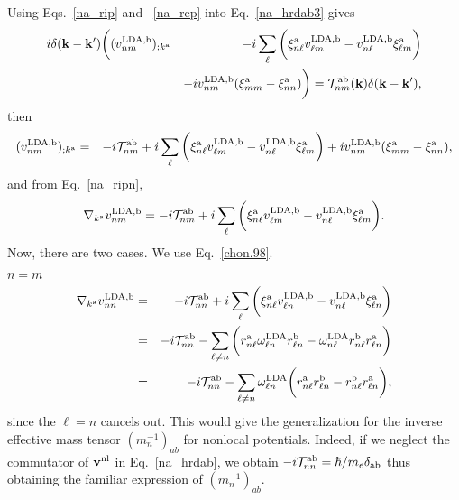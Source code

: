 Using Eqs.~\eqref{na_rip} and ~\eqref{na_rep}
into Eq.~\eqref{na_hrdab3} gives
\begin{eqnarray}\label{na_rapb}
i\delta(\mathbf{k}-\mathbf{k}')
\bigg(
(v^{\mathrm{LDA},\mathrm{b}}_{nm})_{;k^{\mathrm{a}}}
&&
-i
\sum_{\ell}
\bigg(
\xi^{\mathrm{a}}_{n\ell}
v^{\mathrm{LDA},\mathrm{b}}_{\ell m}
-
v^{\mathrm{LDA},\mathrm{b}}_{n\ell}
\xi^{\mathrm{a}}_{\ell m}
\bigg)
\nonumber \\
&&
-i
v^{\mathrm{LDA},\mathrm{b}}_{nm}(\xi^{\mathrm{a}}_{mm}
-
\xi^{\mathrm{a}}_{nn}
)
\bigg)
=
{\cal T}^{\mathrm{a}\mathrm{b}}_{nm}(\mathbf{k})\delta(\mathbf{k}-\mathbf{k}')
,
\end{eqnarray}
then
\begin{eqnarray}\label{na_rapb2}
(v^{\mathrm{LDA},\mathrm{b}}_{nm})_{;k^{\mathrm{a}}}&=&
-i
{\cal T}^{\mathrm{a}\mathrm{b}}_{nm}
+i
\sum_{\ell}
\bigg(
\xi^{\mathrm{a}}_{n\ell}
v^{\mathrm{LDA},\mathrm{b}}_{\ell m}
-
v^{\mathrm{LDA},\mathrm{b}}_{n\ell}
\xi^{\mathrm{a}}_{\ell m}
\bigg)
+i
v^{\mathrm{LDA},\mathrm{b}}_{nm}(\xi^{\mathrm{a}}_{mm}
-
\xi^{\mathrm{a}}_{nn}
)
,
\end{eqnarray}
and from Eq.~\eqref{na_ripn},
\begin{eqnarray}\label{ncogno}
\nabla_{k^{\mathrm{a}}}v^{\mathrm{LDA},\mathrm{b}}_{nm}=
-i{\cal T}^{\mathrm{a}\mathrm{b}}_{nm}
+i
\sum_{\ell}
\bigg(
\xi^{\mathrm{a}}_{n\ell}
v^{\mathrm{LDA},\mathrm{b}}_{\ell m}
-
v^{\mathrm{LDA},\mathrm{b}}_{n\ell}
\xi^{\mathrm{a}}_{\ell m}
\bigg)
.
\end{eqnarray}
Now, there are two cases. We use Eq.~\eqref{chon.98}.

 $n=m$
\begin{eqnarray}\label{ntita}
\nabla_{k^{\mathrm{a}}}v^{\mathrm{LDA},\mathrm{b}}_{nn}&=&
-i{\cal T}^{\mathrm{a}\mathrm{b}}_{nn}
+i
\sum_{\ell}
\bigg(
\xi^{\mathrm{a}}_{n\ell}
v^{\mathrm{LDA},\mathrm{b}}_{\ell n}
-
v^{\mathrm{LDA},\mathrm{b}}_{n\ell}
\xi^{\mathrm{a}}_{\ell n}
\bigg)
\nonumber\\
&=&
-i{\cal T}^{\mathrm{a}\mathrm{b}}_{nn}
-
\sum_{\ell\ne n}
\bigg(
r^{\mathrm{a}}_{n\ell}
\omega^{\mathrm{LDA}}_{\ell n}
r^{\mathrm{b}}_{\ell n}
-
\omega^{\mathrm{LDA}}_{n\ell}
r^{\mathrm{b}}_{n\ell}
r^{\mathrm{a}}_{\ell n}
\bigg)
\nonumber\\
&=&
-i{\cal T}^{\mathrm{a}\mathrm{b}}_{nn}
-
\sum_{\ell\ne n}
\omega^{\mathrm{LDA}}_{\ell n}
\bigg(
r^{\mathrm{a}}_{n\ell}
r^{\mathrm{b}}_{\ell n}
-
r^{\mathrm{b}}_{n\ell}
r^{\mathrm{a}}_{\ell n}
\bigg)
,
\end{eqnarray}
since the $\ell=n$ cancels out. 
This
would give the generalization for the inverse effective mass
tensor $(m_n^{-1})_{ab}$ for nonlocal potentials.
Indeed, if we neglect the commutator of $\mathbf{v}^{\mathrm{nl}}$ in
Eq.~\eqref{na_hrdab}, we obtain 
$-i{\cal T}^{\mathrm{a}\mathrm{b}}_{nn}=\hbar/m_e\delta_{\mathrm{a}\mathrm{b}}$
thus obtaining the  familiar expression of $(m_n^{-1})_{ab}$.\cite{ashcroft_solid_1976}

